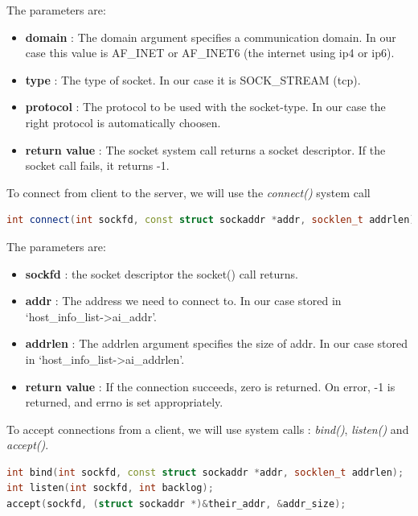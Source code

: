 \documentclass{article}
\begin{document}
				The parameters are:

				\begin{itemize}
				\item \textbf{domain} : The domain argument specifies a communication domain. In our case this value is AF\_INET or AF\_INET6 (the internet using ip4 or ip6). 
				\item \textbf{type} : The type of socket. In our case it is SOCK\_STREAM (tcp). 
				\item \textbf{protocol} : The protocol to be used with the socket-type. In our case the right protocol is automatically choosen. 
				\item \textbf{return value} : The socket system call returns a socket descriptor. If the socket call fails, it returns -1. 
				\end{itemize}

				To connect from client to the server, we will use the \textit{connect()} system call

				\begin{lstlisting}[language=C++, caption={getaddrinfo() function}]
int connect(int sockfd, const struct sockaddr *addr, socklen_t addrlen); 
				\end{lstlisting} 	

				The parameters are:

				\begin{itemize}
				\item \textbf{sockfd} : the socket descriptor the socket() call returns. 
				\item \textbf{addr} : The address we need to connect to. In our case stored in `host\_info\_list->ai\_addr'. 
				\item \textbf{addrlen} : The addrlen argument specifies the size of addr. In our case stored in `host\_info\_list->ai\_addrlen'. 
				\item \textbf{return value} : If the connection succeeds, zero is returned. On error, -1 is returned, and errno is set appropriately.
				\end{itemize}

				To accept connections from a client, we will use system calls : \textit{bind()}, \textit{listen()} and \textit{accept()}.

				\begin{lstlisting}[language=C++, caption={getaddrinfo() function}]
int bind(int sockfd, const struct sockaddr *addr, socklen_t addrlen); 
int listen(int sockfd, int backlog);
accept(sockfd, (struct sockaddr *)&their_addr, &addr_size); 
				\end{lstlisting}				 
\end{document}
